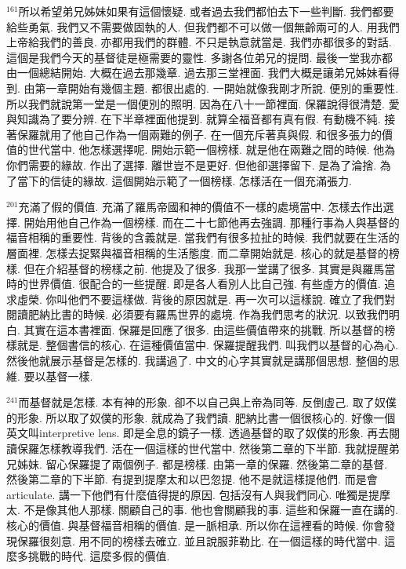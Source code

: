 \documentclass{book}
\begin{document}
$^{161}$所以希望弟兄姊妹如果有這個懷疑.
或者過去我們都怕去下一些判斷.
我們都要給些勇氣.
我們又不需要做固執的人.
但我們都不可以做一個無齡兩可的人.
用我們上帝給我們的善良.
亦都用我們的群體.
不只是執意就當是.
我們亦都很多的對話.
這個是我們今天的基督徒是極需要的靈性.
多謝各位弟兄的提問.
最後一堂我亦都由一個總結開始.
大概在過去那幾章.
過去那三堂裡面.
我們大概是讓弟兄姊妹看得到.
由第一章開始有幾個主題.
都很出處的.
一開始就像我剛才所說.
便別的重要性.
所以我們就說第一堂是一個便別的照明.
因為在八十一節裡面.
保羅說得很清楚.
愛與知識為了要分辨.
在下半章裡面他提到.
就算全福音都有真有假.
有動機不純.
接著保羅就用了他自己作為一個兩難的例子.
在一個充斥著真與假.
和很多張力的價值的世代當中.
他怎樣選擇呢.
開始示範一個榜樣.
就是他在兩難之間的時候.
他為你們需要的緣故.
作出了選擇.
離世豈不是更好.
但他卻選擇留下.
是為了淪捨.
為了當下的信徒的緣故.
這個開始示範了一個榜樣.
怎樣活在一個充滿張力.

$^{201}$充滿了假的價值.
充滿了羅馬帝國和神的價值不一樣的處境當中.
怎樣去作出選擇.
開始用他自己作為一個榜樣.
而在二十七節他再去強調.
那種行事為人與基督的福音相稱的重要性.
背後的含義就是.
當我們有很多拉扯的時候.
我們就要在生活的層面裡.
怎樣去捉緊與福音相稱的生活態度.
而二章開始就是.
核心的就是基督的榜樣.
但在介紹基督的榜樣之前.
他提及了很多.
我那一堂講了很多.
其實是與羅馬當時的世界價值.
很配合的一些提醒.
即是各人看別人比自己強.
有些虛方的價值.
追求虛榮.
你叫他們不要這樣做.
背後的原因就是.
再一次可以這樣說.
確立了我們對閱讀肥納比書的時候.
必須要有羅馬世界的處境.
作為我們思考的狀況.
以致我們明白.
其實在這本書裡面.
保羅是回應了很多.
由這些價值帶來的挑戰.
所以基督的榜樣就是.
整個書信的核心.
在這種價值當中.
保羅提醒我們.
叫我們以基督的心為心.
然後他就展示基督是怎樣的.
我講過了.
中文的心字其實就是講那個思想.
整個的思維.
要以基督一樣.

$^{241}$而基督就是怎樣.
本有神的形象.
卻不以自己與上帝為同等.
反倒虛己.
取了奴僕的形象.
所以取了奴僕的形象.
就成為了我們讀.
肥納比書一個很核心的.
好像一個英文叫interpretive lens.
即是全息的鏡子一樣.
透過基督的取了奴僕的形象.
再去閱讀保羅怎樣教導我們.
活在一個這樣的世代當中.
然後第二章的下半節.
我就提醒弟兄姊妹.
留心保羅提了兩個例子.
都是榜樣.
由第一章的保羅.
然後第二章的基督.
然後第二章的下半節.
有提到提摩太和以巴忽提.
他不是就這樣提他們.
而是會articulate.
講一下他們有什麼值得提的原因.
包括沒有人與我們同心.
唯獨是提摩太.
不是像其他人那樣.
關顧自己的事.
他也會關顧我的事.
這些和保羅一直在講的.
核心的價值.
與基督福音相稱的價值.
是一脈相承.
所以你在這裡看的時候.
你會發現保羅很刻意.
用不同的榜樣去確立.
並且說服菲勒比.
在一個這樣的時代當中.
這麼多挑戰的時代.
這麼多假的價值.
\end{document}
